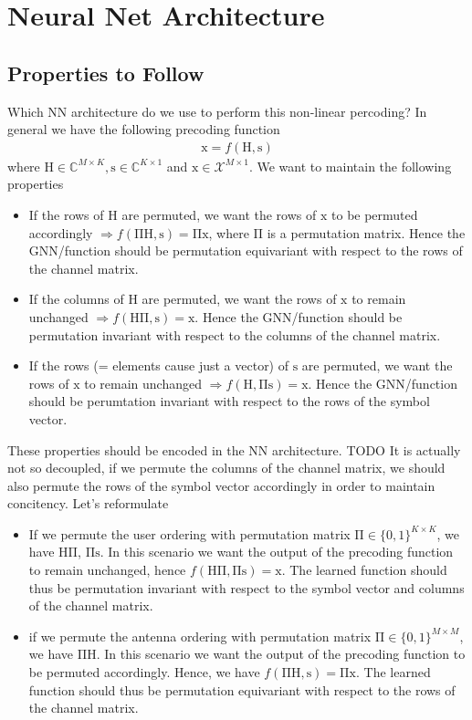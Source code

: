 \documentclass[12pt]{article}
\newcommand{\vect}[1]{\boldsymbol{\mathrm{#1}}}
\newcommand{\mat}[1]{\boldsymbol{\mathrm{#1}}}
\newcommand{\TODO}[1]{{\color{red} TODO {#1}}}
\theoremstyle{remark}
\begin{document}
\section{Neural Net Architecture}
\subsection{Properties to Follow}
Which NN architecture do we use to perform this non-linear percoding? In general we have the following precoding function
\begin{align}
	\vect{x} = f(\mat{H}, \vect{s})
\end{align}
where $\mat{H}\in\mathbb{C}^{M\times K}, \vect{s}\in\mathbb{C}^{K\times 1}$ and $\vect{x} \in \mathcal{X}^{M\times 1}$.
We want to maintain the following properties
\begin{itemize}
	\item If the rows of $\mat{H}$ are permuted, we want the rows of $\vect{x}$ to be permuted accordingly $\Rightarrow f(\mat{\Pi H}, \vect{s}) = \mat{\Pi} \vect{x}$, where $\mat{\Pi}$ is a permutation matrix. Hence the GNN/function should be permutation equivariant with respect to the rows of the channel matrix.
	\item If the columns of $\mat{H}$ are permuted, we want the rows of $\vect{x}$ to remain unchanged $\Rightarrow f(\mat{H \Pi}, \vect{s}) = \vect{x}$. Hence the GNN/function should be permutation invariant with respect to the columns of the channel matrix. 
	\item If the rows (= elements cause just a vector) of $\vect{s}$ are permuted, we want the rows of $\vect{x}$ to remain unchanged $\Rightarrow f(\mat{H}, \mat{\Pi}\vect{s}) = \vect{x}$. Hence the GNN/function should be perumtation invariant with respect to the rows of the symbol vector.
\end{itemize}
These properties should be encoded in the NN architecture. 
\TODO{It is actually not so decoupled, if we permute the columns of the channel matrix, we should also permute the rows of the symbol vector accordingly in order to maintain concitency. Let's reformulate }

\begin{itemize}
	\item If we permute the user ordering with permutation matrix $\mat{\Pi} \in \{0, 1\}^{K\times K}$, we have $\mat{H \Pi}$, $\mat{\Pi}\vect{s}$. In this scenario we want the output of the precoding function to remain unchanged, hence $f(\mat{H \Pi}, \mat{\Pi}\vect{s}) = \vect{x}$. The learned function should thus be permutation invariant with respect to the symbol vector and columns of the channel matrix.
	\item if we permute the antenna ordering with permutation matrix $\mat{\Pi} \in \{0, 1\}^{M\times M}$, we have $\mat{\Pi H}$. In this scenario we want the output of the precoding function to be permuted accordingly. Hence, we have $f(\mat{\Pi H}, \vect{s}) = \mat{\Pi} \vect{x}$. The learned function should thus be permutation equivariant with respect to the rows of the channel matrix. 
\end{itemize}
\end{document}
